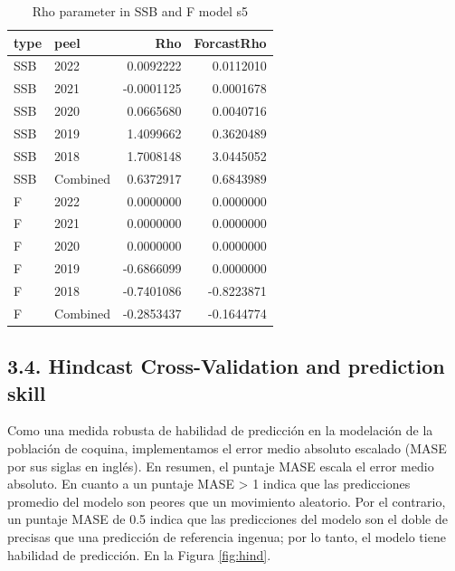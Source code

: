 \documentclass[
]{article}
\begin{document}
\begin{table}[H]

\caption{\label{tab:unnamed-chunk-14}\label{mod5}Rho parameter in SSB  and F model s5}
\centering
\begin{tabular}[t]{llrr}
\toprule
type & peel & Rho & ForcastRho\\
\midrule
SSB & 2022 & 0.0092222 & 0.0112010\\
SSB & 2021 & -0.0001125 & 0.0001678\\
SSB & 2020 & 0.0665680 & 0.0040716\\
SSB & 2019 & 1.4099662 & 0.3620489\\
SSB & 2018 & 1.7008148 & 3.0445052\\
\addlinespace
SSB & Combined & 0.6372917 & 0.6843989\\
F & 2022 & 0.0000000 & 0.0000000\\
F & 2021 & 0.0000000 & 0.0000000\\
F & 2020 & 0.0000000 & 0.0000000\\
F & 2019 & -0.6866099 & 0.0000000\\
\addlinespace
F & 2018 & -0.7401086 & -0.8223871\\
F & Combined & -0.2853437 & -0.1644774\\
\bottomrule
\end{tabular}
\end{table}

\hypertarget{hindcast-cross-validation-and-prediction-skill}{%
\subsection{3.4. Hindcast Cross-Validation and prediction skill}\label{hindcast-cross-validation-and-prediction-skill}}

Como una medida robusta de habilidad de predicción en la modelación de la población de coquina, implementamos el error medio absoluto escalado (MASE por sus siglas en inglés). En resumen, el puntaje MASE escala el error medio absoluto. En cuanto a un puntaje MASE \textgreater{} 1 indica que las predicciones promedio del modelo son peores que un movimiento aleatorio. Por el contrario, un puntaje MASE de 0.5 indica que las predicciones del modelo son el doble de precisas que una predicción de referencia ingenua; por lo tanto, el modelo tiene habilidad de predicción. En la Figura \ref{fig:hind}.
\end{document}
